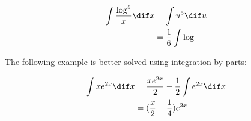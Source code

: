 \documentclass[11pt]{scrartcl}
\begin{document}
\begin{example}

  \begin{align}
    \int \frac{\log^5}{x} \dif x &= \int u^{5} \dif u\\
                                 &= \frac{1}{6}\int\log^{}
  \end{align}

\end{example}

\begin{example}
  The following example is better solved using integration by parts:
  
  \begin{align}
    \int x e^{2x} \dif x & = \frac{xe^{2x}}{2} - \frac{1}{2}\int e^{2x}\dif x \\
                         & =(\frac{x}{2}-\frac{1}{4})e^{2x}
  \end{align}

\end{example}
\end{document}
